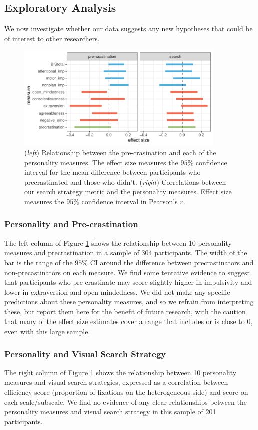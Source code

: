 \documentclass[]{rsos}
\begin{document}
\subsection{Exploratory Analysis}

We now investigate whether our data suggests any new hypotheses that could be of interest to other researchers.  

\begin{figure}[t]
  \centering  
\includegraphics[width=10cm]{../analysis/scratch/exp_strat.pdf}
  \caption{(\textit{left}) Relationship between the pre-crasination and each of the personality measures. The effect size measures the $95\%$ confidence interval for the mean difference between participants who precrastinated and those who didn't. (\textit{right}) Correlations between our search strategy metric and the personality measures. Effect size measures the $95\%$ confidence interval in Pearson's $r$.}
   \label{fig:exp_analysis}
\end{figure}

\subsubsection{Personality and Pre-crastination}
The left column of Figure \ref{fig:exp_analysis} shows the relationship between 10 personality measures and precrastination in a sample of 304 participants. The width of the bar is the range of the $95\%$ CI around the difference between precrastinators and non-precastinators on each measure. We find some tentative evidence to suggest that participants who pre-crastinate may score slightly higher in impulsivity and lower in extraversion and open-mindedness. We did not make any specific predictions about these personality measures, and so we refrain from interpreting these, but report them here for the benefit of future research, with the caution that many of the effect size estimates cover a range that includes or is close to 0, even with this large sample.

\subsubsection{Personality and Visual Search Strategy}
The right column of Figure \ref{fig:exp_analysis} shows the relationship between 10 personality measures and visual search strategies, expressed as a correlation between efficiency score (proportion of fixations on the heterogeneous side) and score on each scale/subscale.  We find no evidence of any clear relationships between the personality measures and visual search strategy in this sample of 201 participants.
\end{document}

